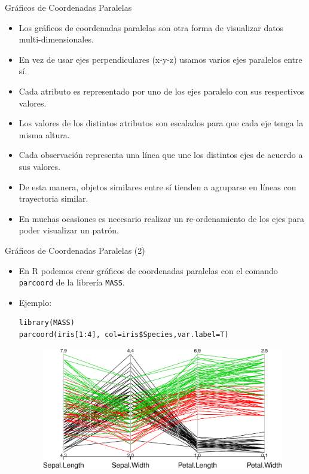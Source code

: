 \documentclass[handout]{beamer}
\begin{document}
\begin{frame}[fragile]{Gráficos de Coordenadas Paralelas}
\scriptsize{
 \begin{itemize}
  \item Los gráficos de coordenadas paralelas son otra forma de visualizar datos multi-dimensionales.
  \item En vez de usar ejes perpendiculares (x-y-z) usamos varios ejes paralelos entre sí.
  \item Cada atributo es representado por uno de los ejes paralelo con sus respectivos valores.
  \item Los valores de los distintos atributos son escalados para que cada eje tenga la misma altura.
  \item Cada observación representa una línea que une los distintos ejes de acuerdo a sus valores.
  \item De esta manera, objetos similares entre sí tienden a agruparse en líneas con trayectoria similar.
  \item En muchas ocasiones es necesario realizar un re-ordenamiento de los ejes para poder visualizar un patrón.
 \end{itemize} 
 
 }  
\end{frame}


\begin{frame}[fragile]{Gráficos de Coordenadas Paralelas (2)}
\scriptsize{
 \begin{itemize}
  \item En R podemos crear gráficos de coordenadas paralelas con el comando \verb+parcoord+ de la librería \verb+MASS+.
  \item Ejemplo:
  \begin{verbatim}
library(MASS)
parcoord(iris[1:4], col=iris$Species,var.label=T)   
  \end{verbatim}
  
  \begin{figure}[h!]
	\centering
	\includegraphics[scale=0.5]{pics/parallel.pdf}		
\end{figure}   

 \end{itemize} 
 
 }  
\end{frame}
\end{document}
